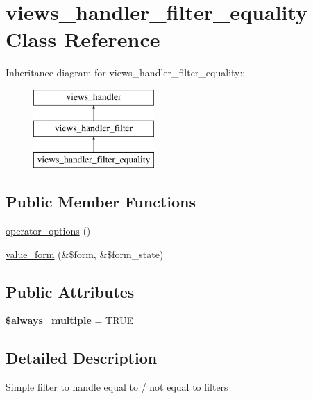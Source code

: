 \hypertarget{classviews__handler__filter__equality}{
\section{views\_\-handler\_\-filter\_\-equality Class Reference}
\label{classviews__handler__filter__equality}
}
Inheritance diagram for views\_\-handler\_\-filter\_\-equality::\begin{figure}[H]
\begin{center}
\leavevmode
\includegraphics[height=3cm]{classviews__handler__filter__equality}
\end{center}
\end{figure}
\subsection*{Public Member Functions}
\begin{DoxyCompactItemize}
\item 
\hyperlink{classviews__handler__filter__equality_a65280b952e08acb863768f6316dbeb33}{operator\_\-options} ()
\item 
\hyperlink{classviews__handler__filter__equality_a5ef4270bd7b8fae32e024f6ca6e7a6b8}{value\_\-form} (\&\$form, \&\$form\_\-state)
\end{DoxyCompactItemize}
\subsection*{Public Attributes}
\begin{DoxyCompactItemize}
\item 
\hypertarget{classviews__handler__filter__equality_a7fec30586ad73fceda991245537fcf8b}{
{\bfseries \$always\_\-multiple} = TRUE}
\label{classviews__handler__filter__equality_a7fec30586ad73fceda991245537fcf8b}

\end{DoxyCompactItemize}


\subsection{Detailed Description}
Simple filter to handle equal to / not equal to filters 


